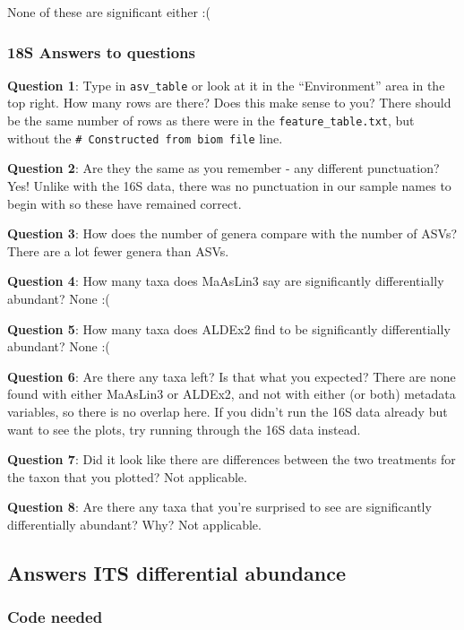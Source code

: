 \documentclass[
]{book}
\begin{document}
None of these are significant either :(

\subsubsection{18S Answers to questions}\label{s-answers-to-questions}

\textbf{Question 1}: Type in \texttt{asv\_table} or look at it in the ``Environment'' area in the top right. How many rows are there? Does this make sense to you?
There should be the same number of rows as there were in the \texttt{feature\_table.txt}, but without the \texttt{\#\ Constructed\ from\ biom\ file} line.

\textbf{Question 2}: Are they the same as you remember - any different punctuation?
Yes! Unlike with the 16S data, there was no punctuation in our sample names to begin with so these have remained correct.

\textbf{Question 3}: How does the number of genera compare with the number of ASVs?
There are a lot fewer genera than ASVs.

\textbf{Question 4}: How many taxa does MaAsLin3 say are significantly differentially abundant?
None :(

\textbf{Question 5}: How many taxa does ALDEx2 find to be significantly differentially abundant?
None :(

\textbf{Question 6}: Are there any taxa left? Is that what you expected?
There are none found with either MaAsLin3 or ALDEx2, and not with either (or both) metadata variables, so there is no overlap here. If you didn't run the 16S data already but want to see the plots, try running through the 16S data instead.

\textbf{Question 7}: Did it look like there are differences between the two treatments for the taxon that you plotted?
Not applicable.

\textbf{Question 8}: Are there any taxa that you're surprised to see are significantly differentially abundant? Why?
Not applicable.

\subsection{Answers ITS differential abundance}\label{answers-its-differential-abundance}

\subsubsection{Code needed}\label{code-needed-1}
\end{document}
